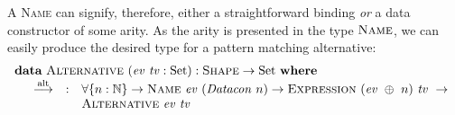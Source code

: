\documentclass[a4paper]{jfp}
\begin{document}
A \textsc{Name} can signify, therefore, either a straightforward binding \emph{or} a data constructor of some arity. As the arity is presented
in the type $\textsc{Name}$, we can easily produce the desired type for a pattern matching alternative:
\begin{displaymath}
   \begin{array}{l}
         \textbf{data}\ \textsc{Alternative}\ (\mathit{ev}\ \mathit{tv} : \text{Set}) : \textsc{Shape} \rightarrow \text{Set}\ \textbf{where} \\
         \quad \begin{array}{lll}
            \stackrel{\text{alt}}{\longrightarrow} & : & \forall \{ n : \mathbb{N} \} \rightarrow \textsc{Name}\ \mathit{ev}\ (\mathit{Datacon}\ n)
      \rightarrow \textsc{Expression}\ (\mathit{ev}\ \oplus\ n)\ \mathit{tv}\ \rightarrow \\ & & \textsc{Alternative}\ \mathit{ev}\ \mathit{tv}
         \end{array}
         \end{array}
\end{displaymath}
\end{document}
